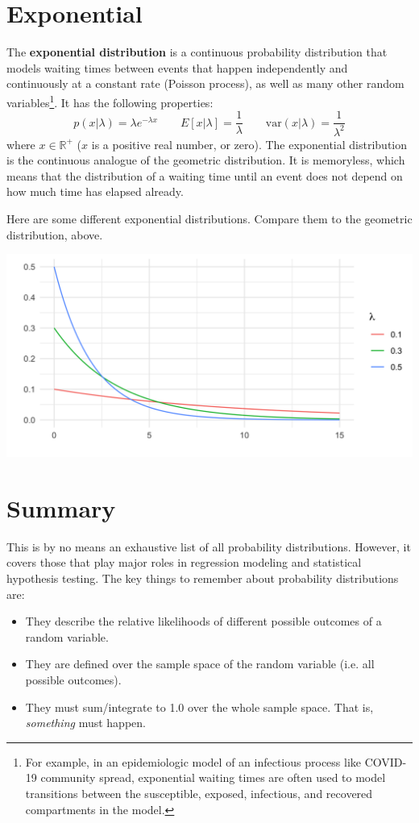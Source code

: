 \section{Exponential}

The \textbf{exponential distribution} is a continuous probability distribution that models waiting times between events that happen independently and continuously at a constant rate (Poisson process), as well as many other random variables\footnote{For example, in an epidemiologic model of an infectious process like COVID-19 community spread, exponential waiting times are often used to model transitions between the susceptible, exposed, infectious, and recovered compartments in the model.}. It has the following properties:
$$ p(x|\lambda) = \lambda e^{-\lambda x} \qquad E[x|\lambda] = \frac{1}{\lambda} \qquad \text{var}(x|\lambda) = \frac{1}{\lambda^2} $$
where $x \in \mathbb{R}^+$ ($x$ is a positive real number, or zero). The exponential distribution is the continuous analogue of the geometric distribution. It is memoryless, which means that the distribution of a waiting time until an event does not depend on how much time has elapsed already.

Here are some different exponential distributions. Compare them to the geometric distribution, above.
\begin{center}
\includegraphics[width=\textwidth]{img/l01-figure5-exponential-lambda-change.png}
\end{center}

\section{Summary}

This is by no means an exhaustive list of all probability distributions. However, it covers those that play major roles in regression modeling and statistical hypothesis testing. The key things to remember about probability distributions are:
\begin{itemize}
\item They describe the relative likelihoods of different possible outcomes of a random variable.
\item They are defined over the sample space of the random variable (i.e. all possible outcomes).
\item They must sum/integrate to 1.0 over the whole sample space. That is, \emph{something} must happen.
\end{itemize}

